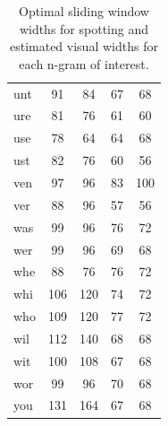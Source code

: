 \documentclass[ms,electronic,twosidetoc,letterpaper,chaptercenter,parttop,lof,lot]{byumsphd}
\begin{document}
\begin{table}
\begin{tabular}{| l | c c | c c |}
  unt & 91 & 84 & 67 & 68 \\
  ure & 81 & 76 & 61 & 60 \\
  use & 78 & 64 & 64 & 68 \\
  ust & 82 & 76 & 60 & 56 \\
  ven & 97 & 96 & 83 & 100 \\
  ver & 88 & 96 & 57 & 56 \\
  was & 99 & 96 & 76 & 72 \\
  wer & 99 & 96 & 69 & 68 \\
  whe & 88 & 76 & 76 & 72 \\
  whi & 106 & 120 & 74 & 72 \\
  who & 109 & 120 & 77 & 72 \\
  wil & 112 & 140 & 68 & 68 \\
  wit & 100 & 108 & 67 & 68 \\
  wor & 99 & 96 & 70 & 68 \\
  you & 131 & 164 & 67 & 68 \\
  \hline 
\end{tabular}
\caption{Optimal sliding window widths for spotting and estimated visual widths for each n-gram of interest.}
\label{tab:customwidths}
\end{table}





\end{document}

